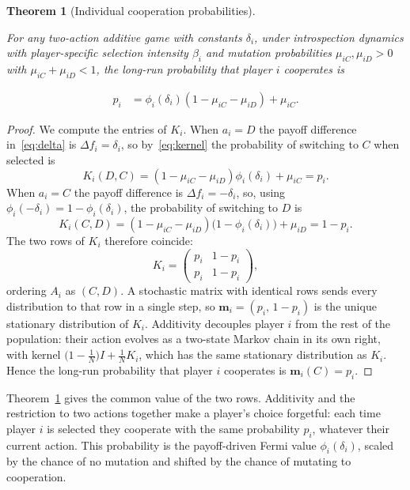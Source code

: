 \documentclass[11pt]{article}
\newtheorem{theorem}{Theorem}
\newcommand{\bfm}{\mathbf{m}}
\begin{document}
\begin{theorem}[Individual cooperation probabilities]\label{thm:decomp}

For any two-action additive game with constants \(\delta_i\), under introspection
dynamics with player-specific selection intensity \(\beta_i\) and mutation probabilities
\(\mu_{iC},\mu_{iD}>0\) with \(\mu_{iC}+\mu_{iD}<1\), the long-run probability that
player \(i\) cooperates is

\begin{align}
  p_i &= \phi_i(\delta_i)(1-\mu_{iC}-\mu_{iD})+\mu_{iC}. \label{eq:pi}
\end{align}
\end{theorem}

\begin{proof}

We compute the entries of \(K_i\). When \(a_i=D\) the payoff difference
in~\eqref{eq:delta} is \(\Delta f_i=\delta_i\), so
by~\eqref{eq:kernel} the probability of switching to \(C\) when
selected is
\[
  K_i(D,C) = (1-\mu_{iC}-\mu_{iD})\phi_i(\delta_i)+\mu_{iC} = p_i.
\]
When \(a_i=C\) the payoff difference is \(\Delta f_i=-\delta_i\), so, using
\(\phi_i(-\delta_i)=1-\phi_i(\delta_i)\), the probability of switching to
\(D\) is
\[
  K_i(C,D) = (1-\mu_{iC}-\mu_{iD})\bigl(1-\phi_i(\delta_i)\bigr)+\mu_{iD}
           = 1-p_i.
\]
The two rows of \(K_i\) therefore coincide:
\[
  K_i = \begin{pmatrix} p_i & 1-p_i\\ p_i & 1-p_i \end{pmatrix},
\]
ordering \(A_i\) as \((C,D)\). A stochastic matrix with identical rows sends
every distribution to that row in a single step, so
\(\bfm_i=(p_i,\,1-p_i)\) is the unique stationary distribution of \(K_i\).
Additivity decouples player \(i\) from the rest of the population: their
action evolves as a two-state Markov chain in its own right, with kernel
\(\bigl(1-\tfrac{1}{N}\bigr)I+\tfrac{1}{N}K_i\), which has the same
stationary distribution as \(K_i\). Hence the long-run probability that
player \(i\) cooperates is \(\bfm_i(C)=p_i\).

\end{proof}

Theorem~\ref{thm:decomp} gives the common value of the two rows.
Additivity and the restriction to two actions together make a player's
choice forgetful: each time player \(i\) is selected they cooperate with
the same probability \(p_i\), whatever their current action. This
probability is the payoff-driven Fermi value \(\phi_i(\delta_i)\), scaled
by the chance of no mutation and shifted by the chance of mutating to
cooperation.
\end{document}
